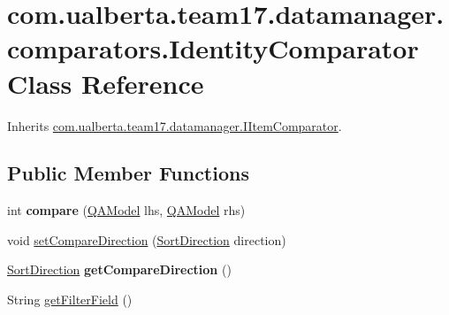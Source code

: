 \hypertarget{classcom_1_1ualberta_1_1team17_1_1datamanager_1_1comparators_1_1_identity_comparator}{\section{com.\+ualberta.\+team17.\+datamanager.\+comparators.\+Identity\+Comparator Class Reference}
\label{classcom_1_1ualberta_1_1team17_1_1datamanager_1_1comparators_1_1_identity_comparator}
}


Inherits \hyperlink{interfacecom_1_1ualberta_1_1team17_1_1datamanager_1_1_i_item_comparator}{com.\+ualberta.\+team17.\+datamanager.\+I\+Item\+Comparator}.

\subsection*{Public Member Functions}
\begin{DoxyCompactItemize}
\item 
\hypertarget{classcom_1_1ualberta_1_1team17_1_1datamanager_1_1comparators_1_1_identity_comparator_a8732943544bc951770ecf1786087f46d}{int {\bfseries compare} (\hyperlink{classcom_1_1ualberta_1_1team17_1_1_q_a_model}{Q\+A\+Model} lhs, \hyperlink{classcom_1_1ualberta_1_1team17_1_1_q_a_model}{Q\+A\+Model} rhs)}\label{classcom_1_1ualberta_1_1team17_1_1datamanager_1_1comparators_1_1_identity_comparator_a8732943544bc951770ecf1786087f46d}

\item 
void \hyperlink{classcom_1_1ualberta_1_1team17_1_1datamanager_1_1comparators_1_1_identity_comparator_a01ba49589fee430522d3370d74e5cdba}{set\+Compare\+Direction} (\hyperlink{enumcom_1_1ualberta_1_1team17_1_1datamanager_1_1_i_item_comparator_1_1_sort_direction}{Sort\+Direction} direction)
\item 
\hypertarget{classcom_1_1ualberta_1_1team17_1_1datamanager_1_1comparators_1_1_identity_comparator_a8a8c1f771741175dd319558906eb9c35}{\hyperlink{enumcom_1_1ualberta_1_1team17_1_1datamanager_1_1_i_item_comparator_1_1_sort_direction}{Sort\+Direction} {\bfseries get\+Compare\+Direction} ()}\label{classcom_1_1ualberta_1_1team17_1_1datamanager_1_1comparators_1_1_identity_comparator_a8a8c1f771741175dd319558906eb9c35}

\item 
String \hyperlink{classcom_1_1ualberta_1_1team17_1_1datamanager_1_1comparators_1_1_identity_comparator_a169860bedfc7ed03fe398b6fbbd0e369}{get\+Filter\+Field} ()
\end{DoxyCompactItemize}


